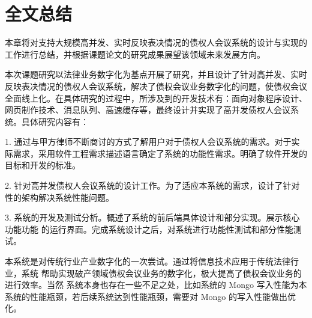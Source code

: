 
\chapter{全文总结}
本章将对支持大规模高并发、实时反映表决情况的债权人会议系统的设计与实现的工作进行总结，并根据课题论文的研究成果展望该领域未来发展方向。

本次课题研究以法律业务数字化为基点开展了研究，并且设计了针对高并发、实时反映表决情况的债权人会议系统，解决了债权会议业务数字化的问题，使债权会议全面线上化。在具体研究的过程中，所涉及到的开发技术有：面向对象程序设计、网页制作技术、消息队列、高速缓存等，最终设计并实现了高并发债权人会议系统。具体研究内容有：

1. 通过与甲方律师不断商讨的方式了解用户对于债权人会议系统的需求。对于实际需求，采用软件工程需求描述语言确定了系统的功能性需求。明确了软件开发的目标和开发的标准。

2. 针对高并发债权人会议系统的设计工作。为了适应本系统的需求，设计了针对性的架构解决系统性能问题。

3. 系统的开发及测试分析。概述了系统的前后端具体设计和部分实现。展示核心功能功能
的运行界面。完成系统设计之后，对系统进行功能性测试和部分性能测试。

本系统是对传统行业产业数字化的一次尝试。通过将信息技术应用于传统法律行业，系统
帮助实现破产领域债权会议业务的数字化，极大提高了债权会议业务的进行效率。当然
系统本身也存在一些不足之处，比如系统的 Mongo 写入性能为本系统的性能瓶颈，若后续系统达到性能瓶颈，需要对 Mongo 的写入性能做出优化。

